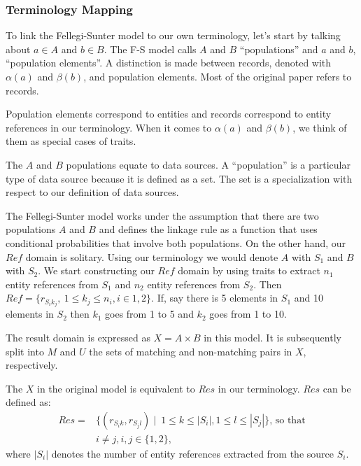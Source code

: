 \documentclass[journal]{IEEEtran}
\begin{document}
    \subsubsection[fms-term]{Terminology Mapping}\label{subsubsec:fsm-term}

    To link the Fellegi-Sunter model to our own terminology, let's start by
    talking about $a \in A$ and $b \in B$.
    The F-S model calls $A$ and $B$ ``populations'' and $a$ and $b$,
    ``population elements''.
    A distinction is made between records, denoted with $\alpha(a)$ and
    $\beta(b)$, and population elements.
    Most of the original paper refers to records.

    Population elements correspond to entities and records correspond to entity
    references in our terminology.
    When it comes to $\alpha(a)$ and $\beta(b)$, we think of them as special
    cases of traits.
        
    The $A$ and $B$ populations equate to data sources.
    A ``population'' is a particular type of data source because it is defined
    as a set.
    The set is a specialization with respect to our definition of data sources.
    
    The Fellegi-Sunter model works under the assumption that there are two
    populations $A$ and $B$ and defines the linkage rule as a function that uses
    conditional probabilities that involve both populations.
    On the other hand, our $Ref$ domain is solitary.
    Using our terminology we would denote $A$ with $S_1$ and $B$ with $S_2$.
    We start constructing our $Ref$ domain by using traits to extract $n_1$
    entity references from $S_1$ and $n_2$ entity references from $S_2$.
    Then $Ref = \{r_{{S_i}{k_j}},~1 \leq k_j \leq n_i, i \in {1, 2} \}$.
    If, say there is 5 elements in $S_1$ and 10 elements in $S_2$ then $k_1$ goes
    from 1 to 5 and $k_2$ goes from 1 to 10.

    The result domain is expressed as $X = A \times B$ in this model.
    It is subsequently split into $M$ and $U$ the sets of matching and
    non-matching pairs in $X$, respectively.

    The $X$ in the original model is equivalent to $Res$ in our terminology.
    $Res$ can be defined as:
    \begin{align}
        Res = &\{(r_{{S_i}{k}}, r_{{S_j}{l}})\mid~1 \leq k \leq |S_i|,
        1 \leq l \leq |S_j|\}\textrm{, so that}\nonumber\\
        &i \neq j, i,j \in \{1, 2\}\textrm{,}\nonumber
    \end{align}
    where $|S_i|$ denotes the number of entity references extracted from the
    source $S_i$.
\end{document}
